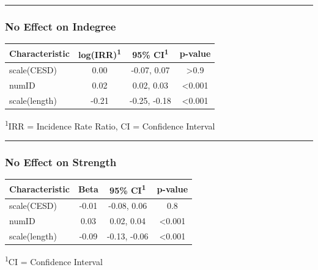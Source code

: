 \documentclass[
  .7em,
  letterpaper,
  DIV=11,
  numbers=noendperiod]{scrartcl}
\begin{document}
\begin{center}\rule{0.5\linewidth}{0.5pt}\end{center}

\hypertarget{no-effect-on-indegree-2}{%
\subsubsection{No Effect on Indegree}\label{no-effect-on-indegree-2}}

\captionsetup[table]{labelformat=empty,skip=1pt}
\setlength{\LTpost}{0mm}
\begin{longtable}{lccc}
\toprule
\textbf{Characteristic} & \textbf{log(IRR)}\textsuperscript{1} & \textbf{95\% CI}\textsuperscript{1} & \textbf{p-value} \\ 
\midrule
scale(CESD) & 0.00 & -0.07, 0.07 & >0.9 \\ 
numID & 0.02 & 0.02, 0.03 & <0.001 \\ 
scale(length) & -0.21 & -0.25, -0.18 & <0.001 \\ 
\bottomrule
\end{longtable}
\begin{minipage}{\linewidth}
\textsuperscript{1}IRR = Incidence Rate Ratio, CI = Confidence Interval\\
\end{minipage}

\begin{center}\rule{0.5\linewidth}{0.5pt}\end{center}

\hypertarget{no-effect-on-strength-1}{%
\subsubsection{No Effect on Strength}\label{no-effect-on-strength-1}}

\captionsetup[table]{labelformat=empty,skip=1pt}
\setlength{\LTpost}{0mm}
\begin{longtable}{lccc}
\toprule
\textbf{Characteristic} & \textbf{Beta} & \textbf{95\% CI}\textsuperscript{1} & \textbf{p-value} \\ 
\midrule
scale(CESD) & -0.01 & -0.08, 0.06 & 0.8 \\ 
numID & 0.03 & 0.02, 0.04 & <0.001 \\ 
scale(length) & -0.09 & -0.13, -0.06 & <0.001 \\ 
\bottomrule
\end{longtable}
\begin{minipage}{\linewidth}
\textsuperscript{1}CI = Confidence Interval\\
\end{minipage}
\end{document}

